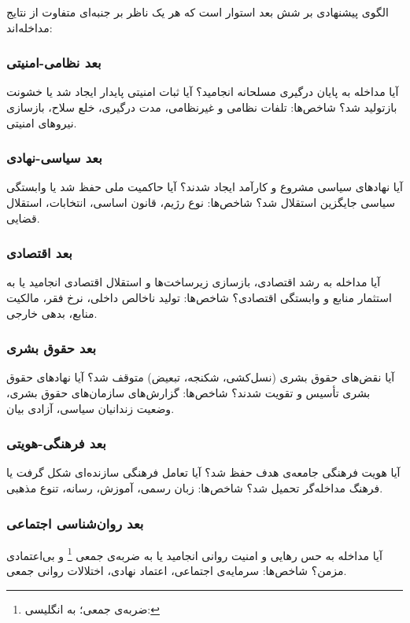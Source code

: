 الگوی پیشنهادی بر شش بعد استوار است که هر یک ناظر بر جنبه‌ای
متفاوت از نتایج مداخله‌اند:

\begin{tcolorbox}[mybox,
	title={شش بعد ارزیابی مداخلات خارجی}]
	
	\subsubsection{بعد نظامی-امنیتی}
	\label{subsubsec:ch04-military}
	آیا مداخله به پایان درگیری مسلحانه انجامید؟ آیا ثبات امنیتی
	پایدار ایجاد شد یا خشونت بازتولید شد؟ شاخص‌ها: تلفات نظامی
	و غیرنظامی، مدت درگیری، خلع سلاح، بازسازی نیروهای
	امنیتی.
	
	\subsubsection{بعد سیاسی-نهادی}
	\label{subsubsec:ch04-political}
	آیا نهادهای سیاسی مشروع و کارآمد ایجاد شدند؟ آیا حاکمیت ملی
	حفظ شد یا وابستگی سیاسی جایگزین استقلال شد؟ شاخص‌ها: نوع رژیم،
	قانون اساسی، انتخابات، استقلال
	قضایی.
	
	\subsubsection{بعد اقتصادی}
	\label{subsubsec:ch04-economic}
	آیا مداخله به رشد اقتصادی، بازسازی زیرساخت‌ها و استقلال اقتصادی
	انجامید یا به استثمار منابع و وابستگی اقتصادی؟ شاخص‌ها:
	تولید ناخالص داخلی، نرخ فقر، مالکیت منابع، بدهی
	خارجی.
	
	\subsubsection{بعد حقوق بشری}
	\label{subsubsec:ch04-hr}
	آیا نقض‌های حقوق بشری (نسل‌کشی، شکنجه، تبعیض) متوقف شد؟ آیا
	نهادهای حقوق بشری تأسیس و تقویت شدند؟ شاخص‌ها: گزارش‌های
	سازمان‌های حقوق بشری، وضعیت زندانیان سیاسی، آزادی
	بیان.
	
	\subsubsection{بعد فرهنگی-هویتی}
	\label{subsubsec:ch04-cultural}
	آیا هویت فرهنگی جامعه‌ی هدف حفظ شد؟ آیا تعامل فرهنگی سازنده‌ای
	شکل گرفت یا فرهنگ مداخله‌گر تحمیل شد؟ شاخص‌ها: زبان رسمی،
	آموزش، رسانه، تنوع مذهبی.
	
	\subsubsection{بعد روان‌شناسی اجتماعی}
	\label{subsubsec:ch04-psycho}
	آیا مداخله به حس رهایی و امنیت روانی انجامید یا به ضربه‌ی
	جمعی%
	\footnote{ضربه‌ی جمعی؛ به انگلیسی: }%
	و بی‌اعتمادی مزمن؟ شاخص‌ها: سرمایه‌ی اجتماعی، اعتماد نهادی،
	اختلالات روانی
	جمعی.
\end{tcolorbox}

